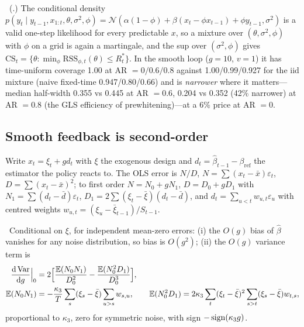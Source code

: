 \begin{construction}
\label{fb:con:arcs}
\tagNumerical\ (.) The conditional density $p(y_t \mid y_{t-1}, x_{1:t}, \theta, \sigma^2, \phi) = \mathcal N(\alpha(1-\phi) + \beta(x_t - \phi x_{t-1}) + \phi y_{t-1}, \sigma^2)$ is a valid one-step likelihood for every predictable $x$, so a mixture over $(\theta, \sigma^2, \phi)$ with $\phi$ on a grid is again a martingale, and the sup over $(\sigma^2, \phi)$ gives $\mathrm{CS}_t = \{\theta : \min_\phi\mathrm{RSS}_{\phi,t}(\theta) \le R^*_t\}$. In the smooth loop ($g = 10$, $v = 1$) it has time-uniform coverage 1.00 at AR $= 0/0.6/0.8$ against 1.00/0.99/0.927 for the iid mixture (naive fixed-time 0.947/0.80/0.66) and is \emph{narrower} where it matters---median half-width 0.355 vs 0.445 at AR $= 0.6$, 0.204 vs 0.352 (42\% narrower) at AR $= 0.8$ (the GLS efficiency of prewhitening)---at a 6\% price at AR $= 0$.
\end{construction}

\subsection{Smooth feedback is second-order}

Write $x_t = \xi_t + gd_t$ with $\xi$ the exogenous design and $d_t = \hat\beta_{t-1} - \beta_{\mathrm{ref}}$ the estimator the policy reacts to. The OLS error is $N/D$, $N = \sum(x_t - \bar x)\varepsilon_t$, $D = \sum(x_t - \bar x)^2$; to first order $N = N_0 + gN_1$, $D = D_0 + gD_1$ with $N_1 = \sum(d_t - \bar d)\varepsilon_t$, $D_1 = 2\sum(\xi_t - \bar\xi)(d_t - \bar d)$, and $d_t = \sum_{u<t}w_{u,t}\varepsilon_u$ with centred weights $w_{u,t} = (\xi_u - \bar\xi_{t-1})/S_{t-1}$.

\begin{theorem}
\label{fb:thm:benign}
\tagEstablished\ Conditional on $\xi$, for independent mean-zero errors: (i) the $O(g)$ bias of $\hat\beta$ vanishes for any noise distribution, so bias is $O(g^2)$; (ii) the $O(g)$ variance term is
\begin{align}
\frac{\mathrm{d}\operatorname{Var}}{\mathrm{d} g}\Big|_0 &= 2\Big[\frac{\mathbb{E}(N_0N_1)}{D_0^2} - \frac{\mathbb{E}(N_0^2D_1)}{D_0^3}\Big],
\label{eq:fb:dvar}\\
\mathbb{E}(N_0N_1) &= -\frac{\kappa_3}{T}\sum_s(\xi_s - \bar\xi)\sum_{u>s}w_{s,u},\qquad
\mathbb{E}(N_0^2D_1) = 2\kappa_3\sum_t(\xi_t - \bar\xi)^2\sum_{s>t}(\xi_s - \bar\xi)w_{t,s},\nonumber
\end{align}
proportional to $\kappa_3$, zero for symmetric noise, with sign $-\operatorname{sign}(\kappa_3g)$.
\end{theorem}

